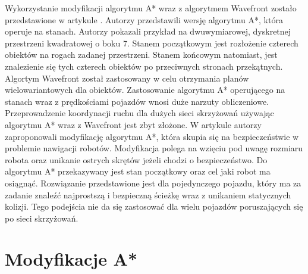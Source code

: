 \newline
\indent
Wykorzystanie modyfikacji algorytmu A* wraz z algorytmem Wavefront zostało przedstawione w artykule \cite{wojnicki2015robust}. Autorzy przedstawili wersję algorytmu A*, która operuje na stanach. Autorzy pokazali przykład na dwuwymiarowej, dyskretnej przestrzeni kwadratowej o boku 7. Stanem początkowym jest rozłożenie czterech obiektów na rogach zadanej przestrzeni. Stanem końcowym natomiast, jest znalezienie się tych czterech obiektów po przeciwnych stronach przekątnych. Algortym Wavefront został zastosowany w celu otrzymania planów wielowariantowych dla obiektów. Zastosowanie algorytmu A* operującego na stanach wraz z prędkościami pojazdów wnosi duże narzuty obliczeniowe. Przeprowadzenie koordynacji ruchu dla dużych sieci skrzyżowań używając algorytmu A* wraz z Wavefront jest zbyt złożone.
\newline
\indent
W artykule \cite{elhalawany2013modified} autorzy zaproponowali modyfikację algorytmu A*, która skupia się na bezpieczeństwie w problemie nawigacji robotów. Modyfikacja polega na wzięciu pod uwagę rozmiaru robota oraz unikanie ostrych skrętów jeżeli chodzi o bezpieczeństwo. Do algorytmu A* przekazywany jest stan początkowy oraz cel jaki robot ma osiągnąć. Rozwiązanie przedstawione jest dla pojedynczego pojazdu, który ma za zadanie znaleźć najprostszą i bezpieczną ścieżkę wraz z unikaniem statycznych kolizji. Tego podejścia nie da się zastosować dla wielu pojazdów poruszających się po sieci skrzyżowań.

\section{Modyfikacje A*}

